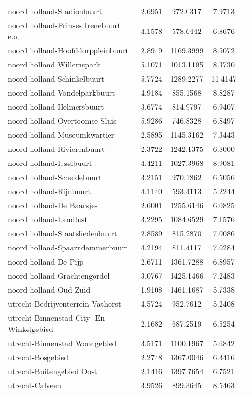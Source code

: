 \begin{longtable}{llccc}
noord holland-Stadionbuurt & 2.6951 & 972.0317 & 7.9713 \\
noord holland-Prinses Irenebuurt e.o. & 4.1578 & 578.6442 & 6.8676 \\
noord holland-Hoofddorppleinbuurt & 2.8949 & 1169.3999 & 8.5072 \\
noord holland-Willemspark & 5.1071 & 1013.1195 & 8.3730 \\
noord holland-Schinkelbuurt & 5.7724 & 1289.2277 & 11.4147 \\
noord holland-Vondelparkbuurt & 4.9184 & 855.1568 & 8.8287 \\
noord holland-Helmersbuurt & 3.6774 & 814.9797 & 6.9407 \\
noord holland-Overtoomse Sluis & 5.9286 & 746.8328 & 6.8497 \\
noord holland-Museumkwartier & 2.5895 & 1145.3162 & 7.3443 \\
noord holland-Rivierenbuurt & 2.3722 & 1242.1375 & 6.8000 \\
noord holland-IJselbuurt & 4.4211 & 1027.3968 & 8.9081 \\
noord holland-Scheldebuurt & 3.2151 & 970.1862 & 6.5056 \\
noord holland-Rijnbuurt & 4.1140 & 593.4113 & 5.2244 \\
noord holland-De Baarsjes & 2.6001 & 1255.6146 & 6.0825 \\
noord holland-Landlust & 3.2295 & 1084.6529 & 7.1576 \\
noord holland-Staatsliedenbuurt & 2.8589 & 815.2870 & 7.0086 \\
noord holland-Spaarndammerbuurt & 4.2194 & 811.4117 & 7.0284 \\
noord holland-De Pijp & 2.6711 & 1361.7288 & 6.8957 \\
noord holland-Grachtengordel & 3.0767 & 1425.1466 & 7.2483 \\
noord holland-Oud-Zuid & 1.9108 & 1461.1687 & 5.7338 \\
utrecht-Bedrijventerrein Vathorst & 4.5724 & 952.7612 & 5.2408 \\
utrecht-Binnenstad City- En Winkelgebied & 2.1682 & 687.2519 & 6.5254 \\
utrecht-Binnenstad Woongebied & 3.5171 & 1100.1967 & 5.6842 \\
utrecht-Bosgebied & 2.2748 & 1367.0046 & 6.3416 \\
utrecht-Buitengebied Oost & 2.1416 & 1397.7654 & 6.7521 \\
utrecht-Calveen & 3.9526 & 899.3645 & 8.5463 \\

\end{longtable}
